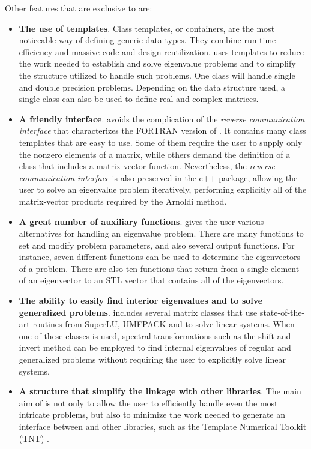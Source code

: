 Other features that are exclusive to \ARPP{} are:

\begin{itemize}
	\item \textbf{The use of templates}. Class templates, or containers, are the most noticeable way of defining generic data types. They combine run-time efficiency and massive code and design reutilization. \ARPP{} uses templates to reduce the work needed to establish and solve eigenvalue problems and to simplify the structure utilized to handle such problems. One class will handle single and double precision problems. Depending on the data structure used, a single class can also be used to define real and complex matrices.
	\item \textbf{A friendly interface}. \ARPP{} avoids the complication of the \textit{reverse communication interface} that characterizes the FORTRAN version of \ARP{}. It contains many class templates that are easy to use. Some of them require the user to supply only the nonzero elements of a matrix, while others demand the definition of a class that includes a matrix-vector function. Nevertheless, the \textit{reverse communication interface} is also preserved in the c++ package, allowing the user to solve an eigenvalue problem iteratively, performing explicitly all of the matrix-vector products required by the Arnoldi method.
	\item \textbf{A great number of auxiliary functions}. \ARPP{} gives the user various alternatives for handling an eigenvalue problem. There are many functions to set  and modify problem parameters, and also several output functions. For instance, seven different functions can be used to determine the eigenvectors of a problem. There are also ten functions that return from a single element of an eigenvector to an STL vector that contains all of the eigenvectors.
	\item \textbf{The ability to easily find interior eigenvalues and to solve generalized problems}. \ARPP{} includes several matrix classes that use state-of-the-art routines from SuperLU, UMFPACK and \LAP{} to solve linear systems. When one of these classes is used, spectral transformations such as the shift and invert method can be employed to find internal eigenvalues of regular and generalized problems without requiring the user to explicitly solve linear systems.
	\item \textbf{A structure that simplify the linkage with other libraries}. The main aim of  \ARPP{} is not only to allow the user to efficiently handle even the most intricate problems, but also to minimize the work needed to generate an interface between \ARP{} and other libraries, such as the Template Numerical Toolkit (TNT) \cite{Pozo:1997:TNT}.
\end{itemize}

